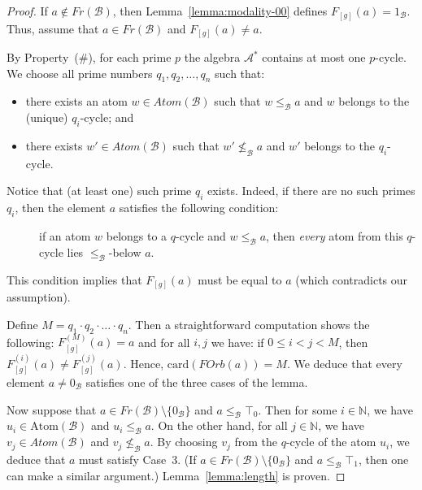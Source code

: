 \documentclass[a4paper,UKenglish,cleveref, autoref, thm-restate]{lipics-v2021}
\begin{document}
\begin{proof}
	If $a\not\in Fr(\mathcal{B})$, then Lemma~\ref{lemma:modality-00} defines $F_{[g]}(a) = 1_{\mathcal{B}}$. Thus, assume that $a\in Fr(\mathcal{B})$ and $F_{[g]}(a) \neq a$.
	
	By Property~(\#), for each prime $p$ the algebra $\mathcal{A}^{\ast}$ contains at most one $p$-cycle. We choose all prime numbers $q_1, q_2,\dots,q_n$ such that:
	\begin{itemize}
		\item there exists an atom $w\in Atom(\mathcal{B})$ such that $w\leq_{\mathcal{B}} a$ and $w$ belongs to the (unique) $q_i$-cycle; and
		
		\item there exists $w' \in Atom(\mathcal{B})$ such that $w' \not\leq_{\mathcal{B}} a$ and $w'$ belongs to the $q_i$-cycle.
	\end{itemize}
	Notice that (at least one) such prime $q_i$ exists. Indeed, if there are no such primes $q_i$, then the element $a$ satisfies the following condition:
	\begin{description}
		\item[] if an atom $w$ belongs to a $q$-cycle and $w\leq_{\mathcal{B}} a$, then \emph{every} atom from this $q$-cycle lies $\leq_{\mathcal{B}}$-below $a$.
	\end{description}
	This condition implies that $F_{[g]}(a)$ must be equal to $a$ (which contradicts our assumption).
	
	Define $M = q_1 \cdot q_2 \cdot \ldots \cdot q_n$. Then a straightforward computation shows the following: $F_{[g]}^{(M)}(a) = a$ and for all $i,j$ we have: if $0\leq i < j < M$, then $F_{[g]}^{(i)}(a) \neq F_{[g]}^{(j)}(a)$. Hence, $\mathrm{card}(FOrb(a)) = M$. 	
	We deduce that every element $a\neq 0_{\mathcal{B}}$ satisfies one of the three cases of the lemma.
	
	Now suppose that $a\in Fr(\mathcal{B}) \setminus \{ 0_{\mathcal{B}}\}$ and $a\leq_{\mathcal{B}} \top_0$. Then for some $i \in\mathbb{N}$, we have $u_i \in \mathrm{Atom}(\mathcal{B})$ and $u_i \leq_{\mathcal{B}} a$. On the other hand, for all $j \in\mathbb{N}$, we have $v_j \in Atom(\mathcal{B})$ and $v_j\not\leq_{\mathcal{B}} a$. By choosing $v_j$ from the $q$-cycle of the atom $u_i$, we deduce that $a$ must satisfy Case~3. (If $a\in Fr(\mathcal{B}) \setminus \{ 0_{\mathcal{B}}\}$ and $a\leq_{\mathcal{B}} \top_1$, then one can make a similar argument.)
	Lemma~\ref{lemma:length} is proven.
\end{proof}
\end{document}
